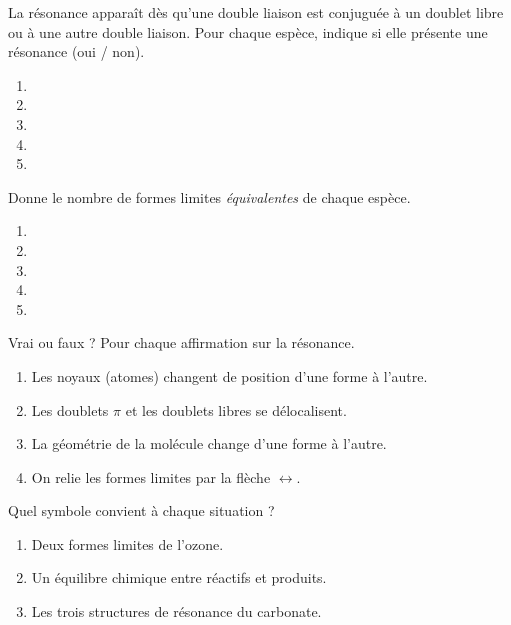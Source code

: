 \documentclass[11pt,a4paper]{article}
\begin{document}
\begin{exo}[y a-t-il résonance ?]
La résonance apparaît dès qu'une double liaison est conjuguée à un doublet libre ou à une autre
double liaison. Pour chaque espèce, indique si elle présente une résonance (oui / non).
\begin{enumerate}[label=\alph*)]
  \item {}
  \item {}
  \item {}
  \item {}
  \item {}
\end{enumerate}
\end{exo}

\begin{exo}
Donne le nombre de formes limites \emph{équivalentes} de chaque espèce.
\begin{enumerate}[label=\alph*)]
  \item {}
  \item {}
  \item {}
  \item {}
  \item {}
\end{enumerate}
\end{exo}

\begin{exo}
Vrai ou faux ? Pour chaque affirmation sur la résonance.
\begin{enumerate}[label=\alph*)]
  \item Les noyaux (atomes) changent de position d'une forme à l'autre.
  \item Les doublets $\pi$ et les doublets libres se délocalisent.
  \item La géométrie de la molécule change d'une forme à l'autre.
  \item On relie les formes limites par la flèche $\leftrightarrow$.
\end{enumerate}
\end{exo}

\begin{exo}
Quel symbole convient à chaque situation ?
\begin{enumerate}[label=\alph*)]
  \item Deux formes limites de l'ozone.
  \item Un équilibre chimique entre réactifs et produits.
  \item Les trois structures de résonance du carbonate.
\end{enumerate}
\end{exo}
\end{document}
